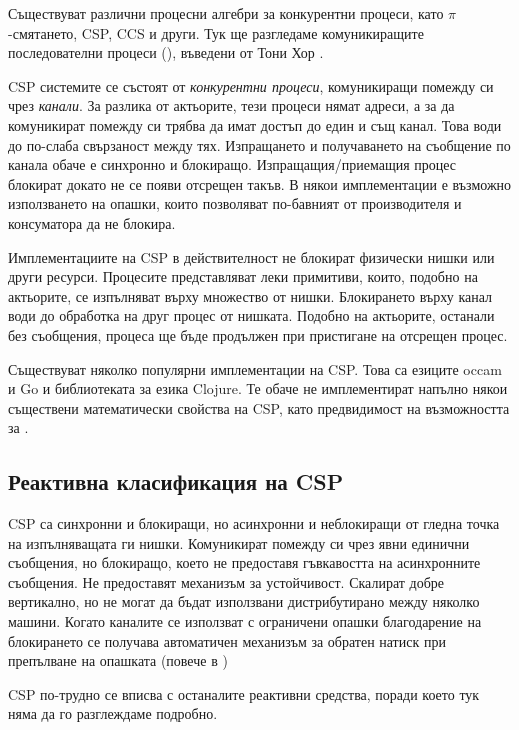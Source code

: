 Съществуват различни процесни алгебри за конкурентни процеси, като $\pi$-смятането, CSP, CCS и други. Тук ще разгледаме комуникиращите последователни процеси (), въведени от Тони Хор \cite{hoare1978CSP}.

CSP системите се състоят от \emph{конкурентни процеси}, комуникиращи помежду си чрез \emph{канали}. За разлика от актьорите, тези процеси нямат адреси, а за да комуникират помежду си трябва да имат достъп до един и същ канал. Това води до по-слаба свързаност между тях. Изпращането и получаването на съобщение по канала обаче е синхронно и блокиращо. Изпращащия/приемащия процес блокират докато не се появи отсрещен такъв. В някои имплементации е възможно използването на опашки, които позволяват по-бавният от производителя и консуматора да не блокира.

Имплементациите на CSP в действителност не блокират физически нишки или други ресурси. Процесите представляват леки примитиви, които, подобно на актьорите, се изпълняват върху множество от нишки. Блокирането върху канал води до обработка на друг процес от нишката. Подобно на актьорите, останали без съобщения, процеса ще бъде продължен при пристигане на отсрещен процес.

Съществуват няколко популярни имплементации на CSP. Това са езиците occam и Go и библиотеката  за езика Clojure. Те обаче не имплементират напълно някои съществени математически свойства на CSP, като предвидимост на възможността за .
\subsection{Реактивна класификация на CSP}

CSP са синхронни и блокиращи, но асинхронни и неблокиращи от гледна точка на изпълняващата ги нишки. Комуникират помежду си чрез явни единични съобщения, но блокиращо, което не предоставя гъвкавостта на асинхронните съобщения. Не предоставят механизъм за устойчивост. Скалират добре вертикално, но не могат да бъдат използвани дистрибутирано между няколко машини. Когато каналите се използват с ограничени опашки благодарение на блокирането се получава автоматичен механизъм за обратен натиск при препълване на опашката (повече в )

CSP по-трудно се вписва с останалите реактивни средства, поради което тук няма да го разглеждаме подробно.

